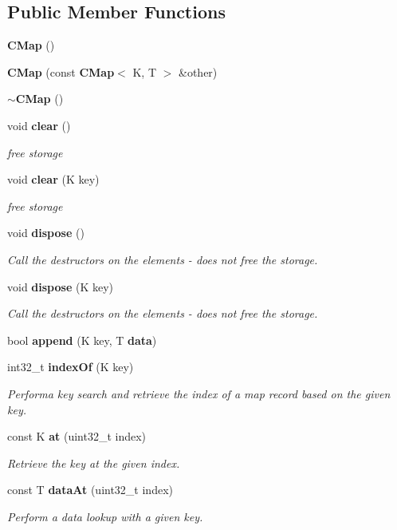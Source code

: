 \subsection*{Public Member Functions}
\begin{DoxyCompactItemize}
\item 
{\bf C\-Map} ()
\item 
{\bf C\-Map} (const {\bf C\-Map}$<$ K, T $>$ \&other)
\item 
{\bf $\sim$\-C\-Map} ()
\item 
void {\bf clear} ()
\begin{DoxyCompactList}\small\item\em free storage \end{DoxyCompactList}\item 
void {\bf clear} (K key)
\begin{DoxyCompactList}\small\item\em free storage \end{DoxyCompactList}\item 
void {\bf dispose} ()
\begin{DoxyCompactList}\small\item\em Call the destructors on the elements -\/ does not free the storage. \end{DoxyCompactList}\item 
void {\bf dispose} (K key)
\begin{DoxyCompactList}\small\item\em Call the destructors on the elements -\/ does not free the storage. \end{DoxyCompactList}\item 
bool {\bf append} (K key, T {\bf data})
\item 
int32\-\_\-t {\bf index\-Of} (K key)
\begin{DoxyCompactList}\small\item\em Performa key search and retrieve the index of a map record based on the given key. \end{DoxyCompactList}\item 
const K {\bf at} (uint32\-\_\-t index)
\begin{DoxyCompactList}\small\item\em Retrieve the key at the given index. \end{DoxyCompactList}\item 
const T {\bf data\-At} (uint32\-\_\-t index)
\begin{DoxyCompactList}\small\item\em Perform a data lookup with a given key. \end{DoxyCompactList}\item 

\end{DoxyCompactItemize}
